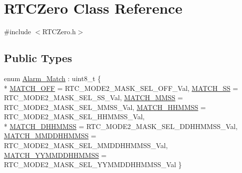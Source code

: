 \hypertarget{class_r_t_c_zero}{}\section{R\+T\+C\+Zero Class Reference}
\label{class_r_t_c_zero}


{\ttfamily \#include $<$R\+T\+C\+Zero.\+h$>$}

\subsection*{Public Types}
\begin{DoxyCompactItemize}
\item 
enum \hyperlink{class_r_t_c_zero_a331ac87204394f0e197122b8962149cc}{Alarm\+\_\+\+Match} \+: uint8\+\_\+t \{ \\*
\hyperlink{class_r_t_c_zero_a331ac87204394f0e197122b8962149cca229a4bf48dedcd24c3058d4659fbdd2b}{M\+A\+T\+C\+H\+\_\+\+O\+FF} = R\+T\+C\+\_\+\+M\+O\+D\+E2\+\_\+\+M\+A\+S\+K\+\_\+\+S\+E\+L\+\_\+\+O\+F\+F\+\_\+\+Val, 
\hyperlink{class_r_t_c_zero_a331ac87204394f0e197122b8962149ccac5092377f2728d1888a72bfb638c95b9}{M\+A\+T\+C\+H\+\_\+\+SS} = R\+T\+C\+\_\+\+M\+O\+D\+E2\+\_\+\+M\+A\+S\+K\+\_\+\+S\+E\+L\+\_\+\+S\+S\+\_\+\+Val, 
\hyperlink{class_r_t_c_zero_a331ac87204394f0e197122b8962149cca944f42500c4e4ee3117ff8adcddc4eb1}{M\+A\+T\+C\+H\+\_\+\+M\+M\+SS} = R\+T\+C\+\_\+\+M\+O\+D\+E2\+\_\+\+M\+A\+S\+K\+\_\+\+S\+E\+L\+\_\+\+M\+M\+S\+S\+\_\+\+Val, 
\hyperlink{class_r_t_c_zero_a331ac87204394f0e197122b8962149ccaf82fa9553250259c004ca80c3f2336cc}{M\+A\+T\+C\+H\+\_\+\+H\+H\+M\+M\+SS} = R\+T\+C\+\_\+\+M\+O\+D\+E2\+\_\+\+M\+A\+S\+K\+\_\+\+S\+E\+L\+\_\+\+H\+H\+M\+M\+S\+S\+\_\+\+Val, 
\\*
\hyperlink{class_r_t_c_zero_a331ac87204394f0e197122b8962149ccad27b4eb26b4e2d23b1e74ca8c7b6473a}{M\+A\+T\+C\+H\+\_\+\+D\+H\+H\+M\+M\+SS} = R\+T\+C\+\_\+\+M\+O\+D\+E2\+\_\+\+M\+A\+S\+K\+\_\+\+S\+E\+L\+\_\+\+D\+D\+H\+H\+M\+M\+S\+S\+\_\+\+Val, 
\hyperlink{class_r_t_c_zero_a331ac87204394f0e197122b8962149cca75b8b65641492bbb35128bddc6164a61}{M\+A\+T\+C\+H\+\_\+\+M\+M\+D\+D\+H\+H\+M\+M\+SS} = R\+T\+C\+\_\+\+M\+O\+D\+E2\+\_\+\+M\+A\+S\+K\+\_\+\+S\+E\+L\+\_\+\+M\+M\+D\+D\+H\+H\+M\+M\+S\+S\+\_\+\+Val, 
\hyperlink{class_r_t_c_zero_a331ac87204394f0e197122b8962149cca4a9fa9226a47b8b760dd53b2326b7f3e}{M\+A\+T\+C\+H\+\_\+\+Y\+Y\+M\+M\+D\+D\+H\+H\+M\+M\+SS} = R\+T\+C\+\_\+\+M\+O\+D\+E2\+\_\+\+M\+A\+S\+K\+\_\+\+S\+E\+L\+\_\+\+Y\+Y\+M\+M\+D\+D\+H\+H\+M\+M\+S\+S\+\_\+\+Val
 \}
\end{DoxyCompactItemize}
